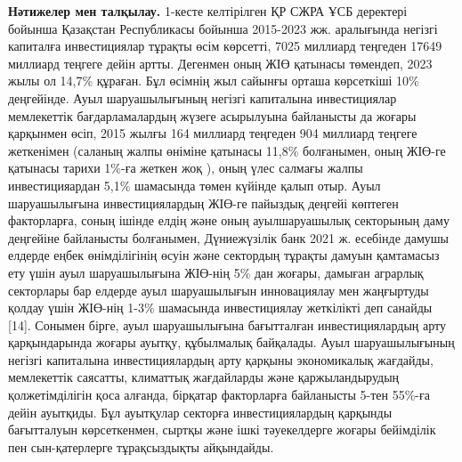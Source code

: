 \begin{multicols}{2}
{\bfseries Нәтижелер мен талқылау.} 1-кесте келтірілген ҚР СЖРА ҰСБ
деректері бойынша Қазақстан Республикасы бойынша 2015-2023 жж.
аралығында негізгі капиталға инвестициялар тұрақты өсім көрсетті, 7025
миллиард теңгеден 17649 миллиард теңгеге дейін артты. Дегенмен оның ЖІӨ
қатынасы төмендеп, 2023 жылы ол 14,7\% құраған. Бұл өсімнің жыл сайынғы
орташа көрсеткіші 10\% деңгейінде. Ауыл шаруашылығының негізгі
капиталына инвестициялар мемлекеттік бағдарламалардың жүзеге асырылуына
байланысты да жоғары қарқынмен өсіп, 2015 жылғы 164 миллиард теңгеден
904 миллиард теңгеге жеткенімен (саланың жалпы өніміне қатынасы 11,8\%
болғанымен, оның ЖІӨ-ге қатынасы тарихи 1\%-ға жеткен жоқ ), оның үлес
салмағы жалпы инвестицияардан 5,1\% шамасында төмен күйінде қалып отыр.
Ауыл шаруашылығына инвестициялардың ЖІӨ-ге пайыздық деңгейі көптеген
факторларға, соның ішінде елдің және оның ауылшаруашылық секторының даму
деңгейіне байланысты болғанымен, Дүниежүзілік банк 2021 ж. есебінде
дамушы елдерде еңбек өнімділігінің өсуін және сектордың тұрақты дамуын
қамтамасыз ету үшін ауыл шаруашылығына ЖІӨ-нің 5\% дан жоғары, дамыған
аграрлық секторлары бар елдерде ауыл шаруашылығын инновациялау мен
жаңғыртуды қолдау үшін ЖІӨ-нің 1-3\% шамасында инвестициялау жеткілікті
деп санайды {[}14{]}. Сонымен бірге, ауыл шаруашылығына бағытталған
инвестициялардың арту қарқындарында жоғары ауытқу, құбылмалық байқалады.
Ауыл шаруашылығының негізгі капиталына инвестициялардың арту қарқыны
экономикалық жағдайды, мемлекеттік саясатты, климаттық жағдайларды және
қаржыландырудың қолжетімділігін қоса алғанда, бірқатар факторларға
байланысты 5-тен 55\%-ға дейін ауытқиды. Бұл ауытқулар секторға
инвестициялардың қарқынды бағытталуын көрсеткенмен, сыртқы және ішкі
тәуекелдерге жоғары бейімділік пен сын-қатерлерге тұрақсыздықты
айқындайды.
\end{multicols}

